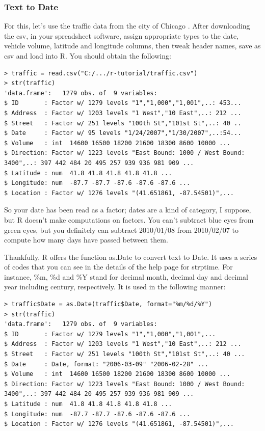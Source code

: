 \documentclass{report}
\newcommand{\code}[1]{\textsf{\ttfamily #1}}
\begin{document}
			\subsubsection{Text to \code{Date}}
			For this, let's use the traffic data from the city of Chicago \cite{traffic}. After downloading the csv, in your spreadsheet software, assign appropriate types to the date, vehicle volume, latitude and longitude columns, then tweak header names, save as csv and load into R. You should obtain the following:
			\begin{verbatim}
> traffic = read.csv("C:/.../r-tutorial/traffic.csv")
> str(traffic)
'data.frame':   1279 obs. of  9 variables:
$ ID       : Factor w/ 1279 levels "1","1,000","1,001",..: 453...
$ Address  : Factor w/ 1203 levels "1 West","10 East",..: 212 ...
$ Street   : Factor w/ 251 levels "100th St","101st St",..: 40 ..
$ Date     : Factor w/ 95 levels "1/24/2007","1/30/2007",..:54...
$ Volume   : int  14600 16500 18200 21600 18300 8600 10000 ...
$ Direction: Factor w/ 1223 levels "East Bound: 1000 / West Bound: 3400",..: 397 442 484 20 495 257 939 936 981 909 ...
$ Latitude : num  41.8 41.8 41.8 41.8 41.8 ...
$ Longitude: num  -87.7 -87.7 -87.6 -87.6 -87.6 ...
$ Location : Factor w/ 1276 levels "(41.651861, -87.54501)",...
			\end{verbatim}
			
			So your date has been read as a factor; dates are a kind of category, I suppose, but R doesn't make computations on factors. You can't subtract blue eyes from green eyes, but you definitely can subtract 2010/01/08 from 2010/02/07 to compute how many days have passed between them.
			
			Thankfully, R offers the function \code{as.Date} to convert text to \code{Date}. It uses a series of codes that you can see in the details of the help page for \code{strptime}. For instance, \code{\%m}, \code{\%d} and \code{\%Y} stand for decimal month, decimal day and decimal year including century, respectively. It is used in the following manner:
			\begin{verbatim}
> traffic$Date = as.Date(traffic$Date, format="%m/%d/%Y")
> str(traffic)
'data.frame':   1279 obs. of  9 variables:
$ ID       : Factor w/ 1279 levels "1","1,000","1,001",...
$ Address  : Factor w/ 1203 levels "1 West","10 East",..: 212 ...
$ Street   : Factor w/ 251 levels "100th St","101st St",..: 40 ...
$ Date     : Date, format: "2006-03-09" "2006-02-28" ...
$ Volume   : int  14600 16500 18200 21600 18300 8600 10000 ...
$ Direction: Factor w/ 1223 levels "East Bound: 1000 / West Bound: 3400",..: 397 442 484 20 495 257 939 936 981 909 ...
$ Latitude : num  41.8 41.8 41.8 41.8 41.8 ...
$ Longitude: num  -87.7 -87.7 -87.6 -87.6 -87.6 ...
$ Location : Factor w/ 1276 levels "(41.651861, -87.54501)",...
			\end{verbatim}
			
\end{document}
